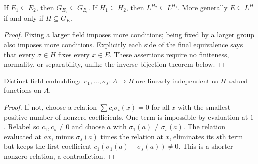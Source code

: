 \begin{proposition}
If $E_1\subseteq E_2$, then $G_{E_2}\subseteq G_{E_1}$. If $H_1\subseteq H_2$, then $L^{H_2}\subseteq L^{H_1}$. More generally $E\subseteq L^H$ if and only if $H\subseteq G_E$.
\end{proposition}
\begin{proof}
Fixing a larger field imposes more conditions; being fixed by a larger group also imposes more conditions. Explicitly each side of the final equivalence says that every $\sigma\in H$ fixes every $x\in E$. These assertions require no finiteness, normality, or separability, unlike the inverse-bijection theorem below.
\end{proof}

\begin{lemma}\label{lem:independent-embeddings}
Distinct field embeddings $\sigma_1,\ldots,\sigma_s:A\to B$ are linearly independent as $B$-valued functions on $A$.
\end{lemma}
\begin{proof}
If not, choose a relation $\sum c_i\sigma_i(x)=0$ for all $x$ with the smallest positive number of nonzero coefficients. One term is impossible by evaluation at $1$. Relabel so $c_1,c_s\ne0$ and choose $a$ with $\sigma_1(a)\ne\sigma_s(a)$. The relation evaluated at $ax$, minus $\sigma_s(a)$ times the relation at $x$, eliminates its $s$th term but keeps the first coefficient $c_1(\sigma_1(a)-\sigma_s(a))\ne0$. This is a shorter nonzero relation, a contradiction.
\end{proof}

